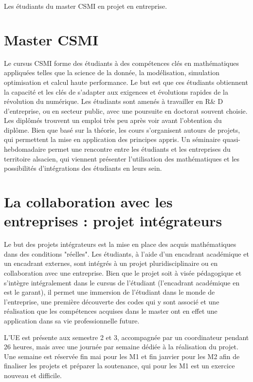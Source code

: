 \documentclass{matapli}
\begin{document}


\begin{soustitre}
Les étudiants du master CSMI en projet en entreprise.
\end{soustitre}

\section*{Master CSMI}
Le cursus CSMI forme des étudiants à des compétences clés en mathématiques appliquées telles que la science de la donnée, la modélisation, simulation optimisation et calcul haute performance.
Le but est que ces étudiants obtiennent la capacité et les clés de s'adapter aux exigences et évolutions rapides de la révolution du numérique.
Les étudiants sont amenés à travailler en R\& D d'entreprise, ou en secteur public, avec une poursuite en doctorat souvent choisie. Les diplômés trouvent un emploi très peu après voir avant l'obtention du diplôme.
Bien que basé sur la théorie, les cours s'organisent autours de projets, qui permettent la mise en application des principes appris.
Un séminaire quasi-hebdomadaire permet une rencontre entre les étudiants et les entreprises du territoire alsacien, qui viennent présenter l'utilisation des mathématiques et les possibilités d'intégrations des étudiants en leurs sein.
\section*{La collaboration avec les entreprises : projet intégrateurs}
Le but des projets intégrateurs est la mise en place des acquis mathématiques dans des conditions "réelles".
Les étudiants, à l'aide d'un encadrant académique et un encadrant externes, sont intégrés à un projet pluridisciplinaire ou en collaboration avec une entreprise.
Bien que le projet soit à visée pédagogique et s'intègre intégralement dans le cursus de l'étudiant (l'encadrant académique en est le garant), il permet une immersion de l'étudiant dans le monde de l'entreprise, une première découverte des codes qui y sont associé et une réalisation que les compétences acquises dans le master ont en effet une application dans sa vie professionnelle future.

L'UE est présente aux semestre 2 et 3, accompagnée par un coordinateur pendant 26 heures, mais avec une journée par semaine dédiée à la réalisation du projet.
Une semaine est réservée fin mai pour les M1 et fin janvier pour les M2 afin de finaliser les projets et préparer la soutenance, qui pour les M1 est un exercice nouveau et difficile.
\end{document}
